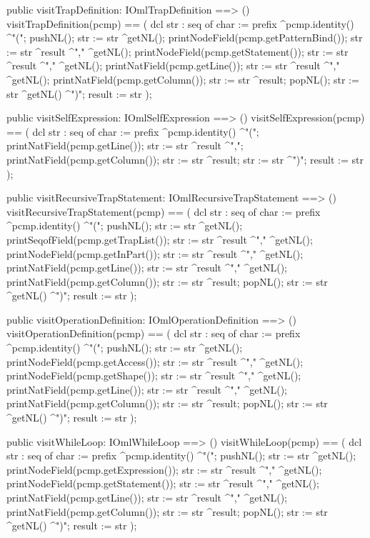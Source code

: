 \begin{vdm_al}
  public visitTrapDefinition: IOmlTrapDefinition ==> ()
  visitTrapDefinition(pcmp) ==
    ( dcl str : seq of char := prefix ^pcmp.identity() ^"(";
      pushNL();
      str := str ^getNL();
      printNodeField(pcmp.getPatternBind());
      str := str ^result ^"," ^getNL();
      printNodeField(pcmp.getStatement());
      str := str ^result ^"," ^getNL();
      printNatField(pcmp.getLine());
      str := str ^result ^"," ^getNL();
      printNatField(pcmp.getColumn());
      str := str ^result;
      popNL();
      str := str ^getNL() ^")";
      result := str );

  public visitSelfExpression: IOmlSelfExpression ==> ()
  visitSelfExpression(pcmp) ==
    ( dcl str : seq of char := prefix ^pcmp.identity() ^"(";
      printNatField(pcmp.getLine());
      str := str ^result ^",";
      printNatField(pcmp.getColumn());
      str := str ^result;
      str := str ^")";
      result := str );

  public visitRecursiveTrapStatement: IOmlRecursiveTrapStatement ==> ()
  visitRecursiveTrapStatement(pcmp) ==
    ( dcl str : seq of char := prefix ^pcmp.identity() ^"(";
      pushNL();
      str := str ^getNL();
      printSeqofField(pcmp.getTrapList());
      str := str ^result ^"," ^getNL();
      printNodeField(pcmp.getInPart());
      str := str ^result ^"," ^getNL();
      printNatField(pcmp.getLine());
      str := str ^result ^"," ^getNL();
      printNatField(pcmp.getColumn());
      str := str ^result;
      popNL();
      str := str ^getNL() ^")";
      result := str );

  public visitOperationDefinition: IOmlOperationDefinition ==> ()
  visitOperationDefinition(pcmp) ==
    ( dcl str : seq of char := prefix ^pcmp.identity() ^"(";
      pushNL();
      str := str ^getNL();
      printNodeField(pcmp.getAccess());
      str := str ^result ^"," ^getNL();
      printNodeField(pcmp.getShape());
      str := str ^result ^"," ^getNL();
      printNatField(pcmp.getLine());
      str := str ^result ^"," ^getNL();
      printNatField(pcmp.getColumn());
      str := str ^result;
      popNL();
      str := str ^getNL() ^")";
      result := str );

  public visitWhileLoop: IOmlWhileLoop ==> ()
  visitWhileLoop(pcmp) ==
    ( dcl str : seq of char := prefix ^pcmp.identity() ^"(";
      pushNL();
      str := str ^getNL();
      printNodeField(pcmp.getExpression());
      str := str ^result ^"," ^getNL();
      printNodeField(pcmp.getStatement());
      str := str ^result ^"," ^getNL();
      printNatField(pcmp.getLine());
      str := str ^result ^"," ^getNL();
      printNatField(pcmp.getColumn());
      str := str ^result;
      popNL();
      str := str ^getNL() ^")";
      result := str );


\end{vdm_al}
